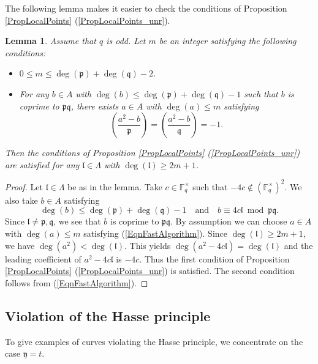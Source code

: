 \documentclass[10pt]{amsart}
\theoremstyle{plain}
\newtheorem{lem}[thm]{Lemma}
\theoremstyle{definition}
\newcommand{\bF}{\mathbb{F}}
\newcommand{\frl}{\mathfrak{l}}
\newcommand{\frp}{\mathfrak{p}}
\newcommand{\frq}{\mathfrak{q}}
\newcommand{\fry}{\mathfrak{y}}
\begin{document}
The following lemma makes it easier to check the conditions of Proposition \ref{PropLocalPoints} (\ref{PropLocalPoints_unr}).
\begin{lem}\label{LemFastAlgorithm}
	Assume that $q$ is odd. 
	Let $m$ be an integer satisfying the following conditions:
	\begin{itemize}
		\item $0\leq m\leq \deg(\frp)+\deg(\frq)-2$.  
		\item For any $b\in A$ with $\deg(b)\leq \deg(\frp)+\deg(\frq)-1$ such that $b$ is coprime to $\frp\frq$,
		there exists $a\in A$ with $\deg(a)\leq m$ satisfying
		\begin{equation}\label{EqnFastAlgorithm}
			\left(\frac{a^2-b}{\frp}\right)=\left(\frac{a^2-b}{\frq}\right)=-1.
		\end{equation}
	\end{itemize} 
	Then the conditions of Proposition \ref{PropLocalPoints} (\ref{PropLocalPoints_unr}) 
	are satisfied for any $\frl\in \Lambda$ with $\deg(\frl)\geq 2m+1$.
\end{lem}
\begin{proof}
	Let $\frl\in \Lambda$ be as in the lemma.
	Take $c\in \bF_q^\times$ such that $-4c\notin (\bF_q^\times)^2$.
	We also take $b\in A$ satisfying 
	\[
	\deg(b) \leq \deg(\frp)+\deg(\frq)-1\quad\text{and}\quad b\equiv 4 c\frl\bmod \frp\frq.
	\]
	Since $\frl\neq \frp,\frq$, we see that $b$ is coprime to $\frp\frq$.
	By assumption we can choose $a\in A$ with $\deg(a)\leq m$ satisfying (\ref{EqnFastAlgorithm}).
	Since $\deg(\frl)\geq 2m+1$, we have $\deg(a^2)<\deg(\frl)$. This yields $\deg(a^2-4c\frl)=\deg(\frl)$ and 
	the leading coefficient of $a^2-4c\frl$ is $-4c$.
	Thus the first condition of Proposition \ref{PropLocalPoints} (\ref{PropLocalPoints_unr})
	is satisfied. The second condition follows from (\ref{EqnFastAlgorithm}).
\end{proof}

\subsection{Violation of the Hasse principle}\label{SubsecHPV}

To give examples of curves violating the Hasse principle, we concentrate on the case $\fry=t$.
\end{document}
